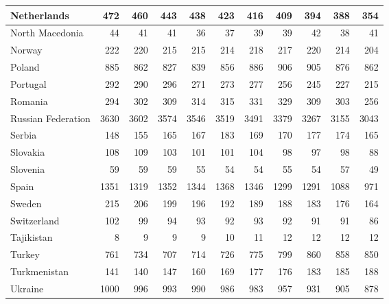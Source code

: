 \begin{table}
\begin{tabular}{|l|r|r|r|r|r|r|r|r|r|r|}
                   Netherlands&    472&    460&    443&    438&    423&    416&    409&    394&    388&    354\\\hline
               North Macedonia&     44&     41&     41&     36&     37&     39&     39&     42&     38&     41\\\hline
                        Norway&    222&    220&    215&    215&    214&    218&    217&    220&    214&    204\\\hline
                        Poland&    885&    862&    827&    839&    856&    886&    906&    905&    876&    862\\\hline
                      Portugal&    292&    290&    296&    271&    273&    277&    256&    245&    227&    215\\\hline
                       Romania&    294&    302&    309&    314&    315&    331&    329&    309&    303&    256\\\hline
            Russian Federation&   3630&   3602&   3574&   3546&   3519&   3491&   3379&   3267&   3155&   3043\\\hline
                        Serbia&    148&    155&    165&    167&    183&    169&    170&    177&    174&    165\\\hline
                      Slovakia&    108&    109&    103&    101&    101&    104&     98&     97&     98&     88\\\hline
                      Slovenia&     59&     59&     59&     55&     54&     54&     55&     54&     57&     49\\\hline
                         Spain&   1351&   1319&   1352&   1344&   1368&   1346&   1299&   1291&   1088&    971\\\hline
                        Sweden&    215&    206&    199&    196&    192&    189&    188&    183&    176&    164\\\hline
                   Switzerland&    102&     99&     94&     93&     92&     93&     92&     91&     91&     86\\\hline
                    Tajikistan&      8&      9&      9&      9&     10&     11&     12&     12&     12&     12\\\hline
                        Turkey&    761&    734&    707&    714&    726&    775&    799&    860&    858&    850\\\hline
                  Turkmenistan&    141&    140&    147&    160&    169&    177&    176&    183&    185&    188\\\hline
                       Ukraine&   1000&    996&    993&    990&    986&    983&    957&    931&    905&    878\\\hline

\end{tabular}
\end{table}
